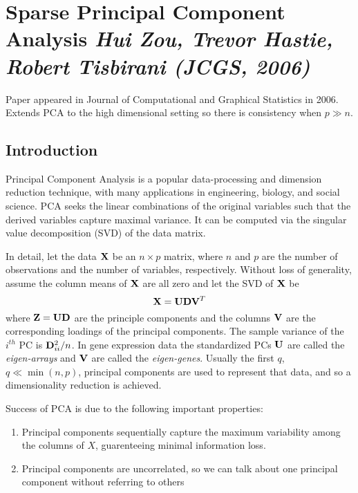 
\section{Sparse Principal Component Analysis \textit{\small Hui Zou, Trevor Hastie, Robert Tisbirani (JCGS, 2006)}}

Paper appeared in Journal of Computational and Graphical Statistics in 2006. Extends PCA to the high dimensional setting so there is consistency when $p \gg n$. 

\subsection{Introduction}

Principal Component Analysis is a popular data-processing and dimension reduction technique, with many applications in engineering, biology, and social science. PCA seeks the linear combinations of the original variables such that the derived variables capture maximal variance. It can be computed via the singular value decomposition (SVD) of the data matrix. 

In detail, let the data $\mathbf{X}$ be an $n\times p$ matrix, where $n$ and $p$ are the number of observations and the number of variables, respectively. Without loss of generality, assume the column means of $\mathbf{X}$ are all zero and let the SVD of $\mathbf{X}$ be 
\begin{equation}
	\label{eq:scpa-1.1}
	\mathbf{X} = \mathbf{U} \mathbf{D} \mathbf{V}^T
\end{equation}
where $\mathbf{Z} = \mathbf{U}\mathbf{D}$ are the principle components and the columns $\mathbf{V}$ are the corresponding loadings of the principal components. The sample variance of the $i^{th}$ PC is $\mathbf{D}^2_{ii}/n$. In gene expression data the standardized PCs $\mathbf{U}$ are called the \emph{eigen-arrays} and $\mathbf{V}$ are called the \emph{eigen-genes}. Usually the first $q$, $q \ll \min(n,p)$, principal components are used to represent that data, and so a dimensionality reduction is achieved. 

Success of PCA is due to the following important properties: 
\begin{enumerate}
 	\item Principal components sequentially capture the maximum variability among the columns of $X$, guarenteeing minimal information loss.
 	\item Principal components are uncorrelated, so we can talk about one principal component without referring to others
 \end{enumerate} 

